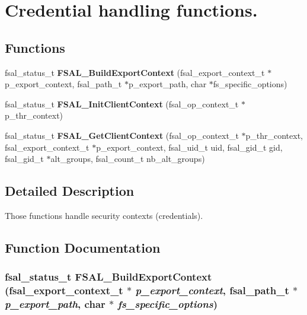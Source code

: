 \section{Credential handling functions.}
\label{group__FSALCredFunctions}
\subsection*{Functions}
\begin{CompactItemize}
\item 
fsal\_\-status\_\-t {\bf FSAL\_\-Build\-Export\-Context} (fsal\_\-export\_\-context\_\-t $\ast$p\_\-export\_\-context, fsal\_\-path\_\-t $\ast$p\_\-export\_\-path, char $\ast$fs\_\-specific\_\-options)
\item 
fsal\_\-status\_\-t {\bf FSAL\_\-Init\-Client\-Context} (fsal\_\-op\_\-context\_\-t $\ast$p\_\-thr\_\-context)\label{group__FSALCredFunctions_ga1}

\item 
fsal\_\-status\_\-t {\bf FSAL\_\-Get\-Client\-Context} (fsal\_\-op\_\-context\_\-t $\ast$p\_\-thr\_\-context, fsal\_\-export\_\-context\_\-t $\ast$p\_\-export\_\-context, fsal\_\-uid\_\-t uid, fsal\_\-gid\_\-t gid, fsal\_\-gid\_\-t $\ast$alt\_\-groups, fsal\_\-count\_\-t nb\_\-alt\_\-groups)
\end{CompactItemize}


\subsection{Detailed Description}
Those functions handle security contexts (credentials). 

\subsection{Function Documentation}
\subsubsection{\setlength{\rightskip}{0pt plus 5cm}fsal\_\-status\_\-t FSAL\_\-Build\-Export\-Context (fsal\_\-export\_\-context\_\-t $\ast$ {\em p\_\-export\_\-context}, fsal\_\-path\_\-t $\ast$ {\em p\_\-export\_\-path}, char $\ast$ {\em fs\_\-specific\_\-options})}\label{group__FSALCredFunctions_ga0}


